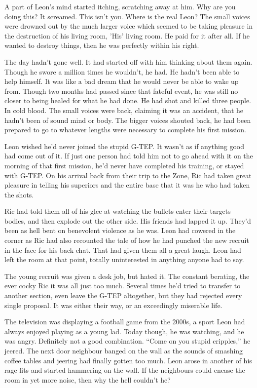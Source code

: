 A part of Leon's mind started itching, scratching away at him.  Why are you doing this? It screamed.  This isn't you.  Where is the real Leon?  The small voices were drowned out by the much larger voice which seemed to be taking pleasure in the destruction of his living room, 'His' living room.  He paid for it after all.  If he wanted to destroy things, then he was perfectly within his right.  

The day hadn't gone well.  It had started off with him thinking about them again.  Though he swore a million times he wouldn't, he had.  He hadn't been able to help himself.  It was like a bad dream that he would never be able to wake up from.  Though two months had passed since that fateful event, he was still no closer to being healed for what he had done.  He had shot and killed three people.  In cold blood.  The small voices were back, claiming it was an accident, that he hadn't been of sound mind or body.  The bigger voices shouted back, he had been prepared to go to whatever lengths were necessary to complete his first mission.  

Leon wished he'd never joined the stupid G-TEP.  It wasn't as if anything good had come out of it.  If just one person had told him not to go ahead with it on the morning of that first mission, he'd never have completed his training, or stayed with G-TEP.  On his arrival back from their trip to the Zone, Ric had taken great pleasure in telling his superiors and the entire base that it was he who had taken the shots.  

Ric had told them all of his glee at watching the bullets enter their targets bodies, and then explode out the other side.  His friends had lapped it up.  They'd been as hell bent on benevolent violence as he was.  Leon had cowered in the corner as Ric had also recounted the tale of how he had punched the new recruit in the face for his back chat.  That had given them all a great laugh.  Leon had left the room at that point, totally uninterested in anything anyone had to say.  

The young recruit was given a desk job, but hated it.  The constant berating, the ever cocky Ric it was all just too much.  Several times he'd tried to transfer to another section, even leave the G-TEP altogether, but they had rejected every single proposal.  It was either their way, or an exceedingly miserable life.  

The television was displaying a football game from the 2000s, a sport Leon had always enjoyed playing as a young lad.  Today though, he was watching, and he was angry.  Definitely not a good combination.  ``Come on you stupid cripples,'' he jeered.  The next door neighbour banged on the wall as the sounds of smashing coffee tables and jeering had finally gotten too much.  Leon arose in another of his rage fits and started hammering on the wall.  If the neighbours could encase the room in yet more noise, then why the hell couldn't he?

